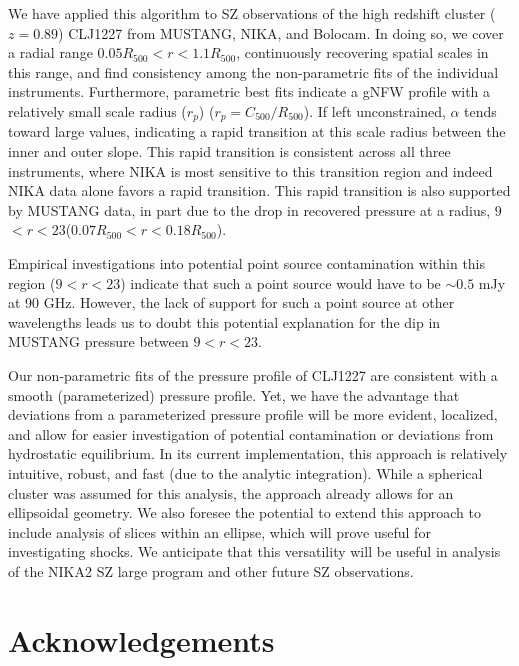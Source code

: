 \documentclass[onecolumn,traditabstract]{aa}
\begin{document}
We have applied this algorithm to SZ observations of the high redshift cluster ($z = 0.89$)
CLJ1227 from MUSTANG, NIKA, and Bolocam. In doing so, we cover a radial range
$0.05 R_{500} < r < 1.1 R_{500}$, continuously recovering spatial scales in this range,
and find consistency among the non-parametric fits of the individual instruments. Furthermore,
parametric best fits indicate a gNFW profile with a relatively small scale radius ($r_p$)
($r_p = C_{500}/R_{500}$). If left unconstrained, $\alpha$ tends toward large values, indicating
a rapid transition at this scale radius between the inner and outer slope. This rapid transition
is consistent across all three instruments, where NIKA is most sensitive to this transition
region and indeed NIKA data alone favors a rapid transition. This rapid transition is also
supported by MUSTANG data, in part due to the drop in recovered pressure at a radius,
$9$\asecs $< r < 23$\asec ($0.07 R_{500} < r < 0.18 R_{500}$).

Empirical investigations into potential point source contamination within this region ($9$\asec $< r < 23$\asec)
indicate that such a point source would have to be $\sim 0.5$ mJy at 90 GHz.
However, the lack of support for such a point source at other wavelengths leads us to doubt this potential explanation for
the dip in MUSTANG pressure between $9$\asecs $< r < 23$\asec.

Our non-parametric fits of the pressure profile of CLJ1227 are consistent with a smooth (parameterized) pressure profile.
Yet, we have the advantage that deviations from a parameterized pressure profile will be more evident, localized, and
allow for easier investigation of potential contamination or deviations from hydrostatic equilibrium. In its current implementation,
this approach is relatively intuitive, robust, and fast (due to the analytic integration). While a spherical cluster was assumed
for this analysis, the approach already allows for an ellipsoidal geometry. We also foresee the potential to extend this approach
to include analysis of slices within an ellipse, which will prove useful for investigating shocks. We anticipate that this
versatility will be useful in analysis of the NIKA2 SZ large program \citet{comis2016} and other future SZ observations.


\section*{Acknowledgements}
\end{document}
